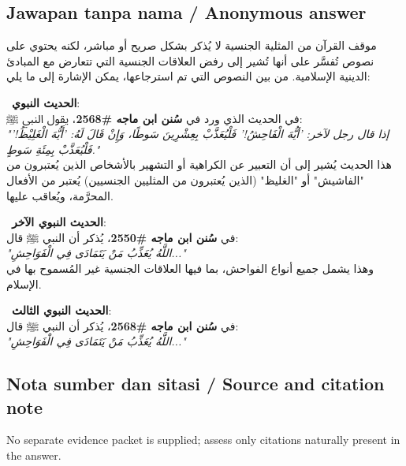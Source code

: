 \documentclass[11pt,a4paper]{article}
\newcommand{\ar}[1]{{\arabicfont #1}}
\begin{document}
\subsection*{Jawapan tanpa nama / Anonymous answer}
\ar{موقف} \ar{القرآن} \ar{من} \ar{المثلية} \ar{الجنسية} \ar{لا} \ar{يُذكر} \ar{بشكل} \ar{صريح} \ar{أو} \ar{مباشر،} \ar{لكنه} \ar{يحتوي} \ar{على} \ar{نصوص} \ar{تُفسَّر} \ar{على} \ar{أنها} \ar{تُشير} \ar{إلى} \ar{رفض} \ar{العلاقات} \ar{الجنسية} \ar{التي} \ar{تتعارض} \ar{مع} \ar{المبادئ} \ar{الدينية} \ar{الإسلامية}. \ar{من} \ar{بين} \ar{النصوص} \ar{التي} \ar{تم} \ar{استرجاعها،} \ar{يمكن} \ar{الإشارة} \ar{إلى} \ar{ما} \ar{يلي}:\par\medskip \textbullet\ \textbf{\ar{الحديث} \ar{النبوي}}:\\ \ar{في} \ar{الحديث} \ar{الذي} \ar{ورد} \ar{في} \textbf{\ar{سُنن} \ar{ابن} \ar{ماجه} \#2568}\ar{،} \ar{يقول} \ar{النبي} \ar{ﷺ}:\\ \emph{"\ar{إذا} \ar{قال} \ar{رجل} \ar{لآخر}: '\ar{أيُّهَ} \ar{الْفَاحِشُ}!' \ar{فَلْيُعَذَّبْ} \ar{بِعِشْرِينَ} \ar{سَوطًا،} \ar{وَإِنْ} \ar{قَالَ} \ar{لَهُ}: '\ar{أَيُّهَ} \ar{الْغَلِيْظُ}!' \ar{فَلْيُعَذَّبْ} \ar{بِمِئَةِ} \ar{سَوطٍ}."}\\ \ar{هذا} \ar{الحديث} \ar{يُشير} \ar{إلى} \ar{أن} \ar{التعبير} \ar{عن} \ar{الكراهية} \ar{أو} \ar{التشهير} \ar{بالأشخاص} \ar{الذين} \ar{يُعتبرون} \ar{من} "\ar{الفاشيش}" \ar{أو} "\ar{الغليظ}" (\ar{الذين} \ar{يُعتبرون} \ar{من} \ar{المثليين} \ar{الجنسيين}) \ar{يُعتبر} \ar{من} \ar{الأفعال} \ar{المحرَّمة،} \ar{ويُعاقب} \ar{عليها}.\par\medskip \textbullet\ \textbf{\ar{الحديث} \ar{النبوي} \ar{الآخر}}:\\ \ar{في} \textbf{\ar{سُنن} \ar{ابن} \ar{ماجه} \#2550}\ar{،} \ar{يُذكر} \ar{أن} \ar{النبي} \ar{ﷺ} \ar{قال}:\\ \emph{"\ar{اللَّهُ} \ar{يُعَذِّبُ} \ar{مَنْ} \ar{يَتَمَادَى} \ar{فِي} \ar{الْفَوَاحِشِ}..."}\\ \ar{وهذا} \ar{يشمل} \ar{جميع} \ar{أنواع} \ar{الفواحش،} \ar{بما} \ar{فيها} \ar{العلاقات} \ar{الجنسية} \ar{غير} \ar{المُسموح} \ar{بها} \ar{في} \ar{الإسلام}.\par\medskip \textbullet\ \textbf{\ar{الحديث} \ar{النبوي} \ar{الثالث}}:\\ \ar{في} \textbf{\ar{سُنن} \ar{ابن} \ar{ماجه} \#2568}\ar{،} \ar{يُذكر} \ar{أن} \ar{النبي} \ar{ﷺ} \ar{قال}:\\ \emph{"\ar{اللَّهُ} \ar{يُعَذِّبُ} \ar{مَنْ} \ar{يَتَمَادَى} \ar{فِي} \ar{الْفَوَاحِشِ}..."}

\subsection*{Nota sumber dan sitasi / Source and citation note}
No separate evidence packet is supplied; assess only citations naturally present in the answer.
\end{document}
